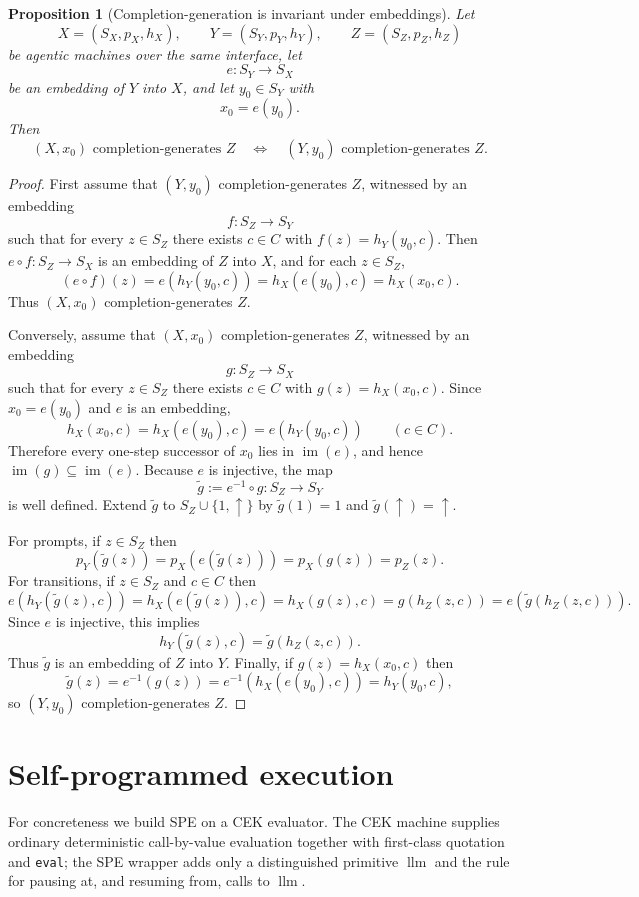 \documentclass[11pt]{article}
\newtheorem{proposition}[definition]{Proposition}
\newcommand{\llm}{\operatorname{llm}}
\begin{document}
\begin{proposition}[Completion-generation is invariant under embeddings]\label{prop:cg-invariance}
Let
\[
X=(S_X,p_X,h_X),\qquad Y=(S_Y,p_Y,h_Y),\qquad Z=(S_Z,p_Z,h_Z)
\]
be agentic machines over the same interface, let
\[
e:S_Y\to S_X
\]
be an embedding of $Y$ into $X$, and let $y_0\in S_Y$ with
\[
x_0=e(y_0).
\]
Then
\[
(X,x_0)\text{ completion-generates } Z
\quad\Longleftrightarrow\quad
(Y,y_0)\text{ completion-generates } Z.
\]
\end{proposition}

\begin{proof}
First assume that $(Y,y_0)$ completion-generates $Z$, witnessed by an embedding
\[
f:S_Z\to S_Y
\]
such that for every $z\in S_Z$ there exists $c\in C$ with $f(z)=h_Y(y_0,c)$. Then $e\circ f:S_Z\to S_X$ is an embedding of $Z$ into $X$, and for each $z\in S_Z$,
\[
(e\circ f)(z)=e(h_Y(y_0,c))=h_X(e(y_0),c)=h_X(x_0,c).
\]
Thus $(X,x_0)$ completion-generates $Z$.

Conversely, assume that $(X,x_0)$ completion-generates $Z$, witnessed by an embedding
\[
g:S_Z\to S_X
\]
such that for every $z\in S_Z$ there exists $c\in C$ with $g(z)=h_X(x_0,c)$. Since $x_0=e(y_0)$ and $e$ is an embedding,
\[
h_X(x_0,c)=h_X(e(y_0),c)=e(h_Y(y_0,c))
\qquad(c\in C).
\]
Therefore every one-step successor of $x_0$ lies in $\operatorname{im}(e)$, and hence $\operatorname{im}(g)\subseteq \operatorname{im}(e)$. Because $e$ is injective, the map
\[
\tilde g:=e^{-1}\circ g:S_Z\to S_Y
\]
is well defined. Extend $\tilde g$ to $S_Z\cup\{1,\uparrow\}$ by $\tilde g(1)=1$ and $\tilde g(\uparrow)=\uparrow$.

For prompts, if $z\in S_Z$ then
\[
p_Y(\tilde g(z))=p_X(e(\tilde g(z)))=p_X(g(z))=p_Z(z).
\]
For transitions, if $z\in S_Z$ and $c\in C$ then
\[
e(h_Y(\tilde g(z),c))
= h_X(e(\tilde g(z)),c)
= h_X(g(z),c)
= g(h_Z(z,c))
= e(\tilde g(h_Z(z,c))).
\]
Since $e$ is injective, this implies
\[
h_Y(\tilde g(z),c)=\tilde g(h_Z(z,c)).
\]
Thus $\tilde g$ is an embedding of $Z$ into $Y$. Finally, if $g(z)=h_X(x_0,c)$ then
\[
\tilde g(z)=e^{-1}(g(z))=e^{-1}(h_X(e(y_0),c))=h_Y(y_0,c),
\]
so $(Y,y_0)$ completion-generates $Z$.
\end{proof}

\section{Self-programmed execution}

For concreteness we build SPE on a CEK evaluator. The CEK machine supplies ordinary deterministic call-by-value evaluation together with first-class quotation and \texttt{eval}; the SPE wrapper adds only a distinguished primitive $\llm$ and the rule for pausing at, and resuming from, calls to $\llm$.
\end{document}
